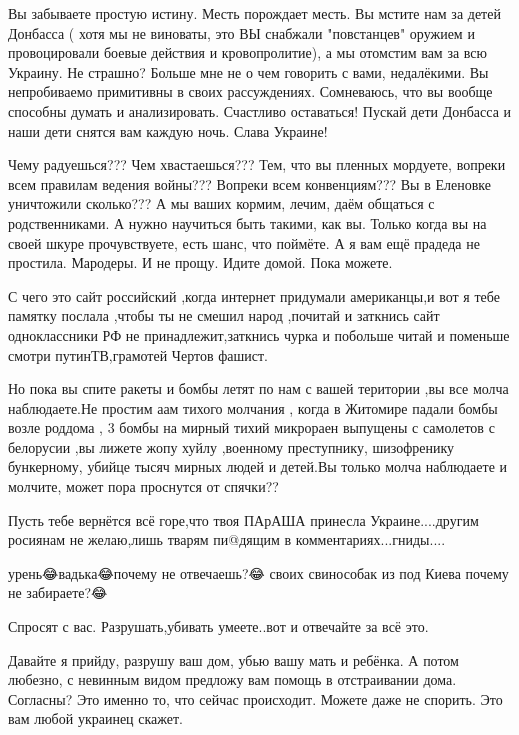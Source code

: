 Вы забываете простую истину. Месть порождает месть. Вы мстите нам за детей
Донбасса ( хотя мы не виноваты, это ВЫ снабжали "повстанцев" оружием и
провоцировали боевые действия и кровопролитие), а мы отомстим вам за всю
Украину. Не страшно?  Больше мне не о чем говорить с вами, недалёкими. Вы
непробиваемо примитивны в своих рассуждениях. Сомневаюсь, что вы вообще
способны думать и анализировать.  Счастливо оставаться! Пускай дети Донбасса и
наши дети снятся вам каждую ночь.  Слава Украине!

Чему радуешься??? Чем хвастаешься???
Тем, что вы пленных мордуете, вопреки всем правилам ведения войны??? Вопреки всем конвенциям???
Вы в Еленовке уничтожили сколько???
А мы ваших кормим, лечим, даём общаться с родственниками.
А нужно научиться быть такими, как вы.
Только когда вы на своей шкуре прочувствуете, есть шанс, что поймёте.
А я вам ещё прадеда не простила. Мародеры. И не прощу.
Идите домой.
Пока можете.

С чего это сайт российский ,когда интернет придумали американцы,и вот я тебе
памятку послала ,чтобы ты не смешил народ ,почитай и заткнись сайт
одноклассники РФ не принадлежит,заткнись чурка и побольше читай и поменьше
смотри путинТВ,грамотей Чертов фашист.

Но пока вы спите ракеты и бомбы летят по нам с вашей територии ,вы все молча
наблюдаете.Не простим аам тихого молчания , когда в Житомире падали бомбы возле
роддома , 3 бомбы на мирный тихий микрораен выпущены с самолетов с белорусии
,вы лижете жопу хуйлу ,военному преступнику, шизофренику бункерному, убийце
тысяч мирных людей и детей.Вы только молча наблюдаете и молчите, может пора
проснутся от спячки??

Пусть тебе вернётся всё горе,что твоя ПАрАША принесла Украине....другим
росиянам не желаю,лишь тварям пи@дящим в комментариях...гниды....

урень😂вадька😂почему не отвечаешь?😂 своих свинособак из под Киева почему не
забираете?😂

Спросят с вас. Разрушать,убивать умеете..вот и отвечайте за всё это.

Давайте я прийду, разрушу ваш дом, убью вашу мать и ребёнка. А потом любезно, с невинным видом предложу вам помощь в отстраивании дома. Согласны?
Это именно то, что сейчас происходит. Можете даже не спорить. Это вам любой украинец скажет.

